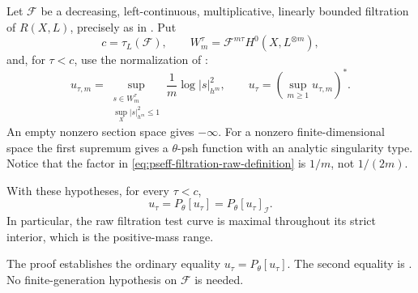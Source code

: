 Let \(\mathcal F\) be a decreasing, left-continuous, multiplicative,
linearly bounded filtration of \(R(X,L)\), precisely as in
\cite[Definition~4.1]{DXZ23}.  Put
\[
 c=\tau_L(\mathcal F),\qquad
 W_m^\tau=\mathcal F^{m\tau}H^0(X,L^{\otimes m}),
\]
and, for \(\tau<c\), use the normalization of
\cite[Definition~4.3]{DXZ23}:
\[
\tag{71.48a}\label{eq:pseff-filtration-raw-definition}
 u_{\tau,m}
 =\sup_{\substack{s\in W_m^\tau\\
             \sup_X|s|_{h^m}^2\leq1}}
       \frac1m\log|s|_{h^m}^2,\qquad
 u_\tau=\left(\sup_{m\geq1}u_{\tau,m}\right)^*.
\]
An empty nonzero section space gives \(-\infty\).
For a nonzero finite-dimensional space the first supremum gives a
\(\theta\)-psh function with an analytic singularity type.  Notice that the
factor in \eqref{eq:pseff-filtration-raw-definition} is \(1/m\), not
\(1/(2m)\).

\begin{theorem}\label{thm:pseff-filtration-maximality}
With these hypotheses, for every \(\tau<c\),
\[
\tag{71.48b}\label{eq:pseff-filtration-maximality}
 u_\tau=P_\theta[u_\tau]=P_\theta[u_\tau]_{\mathcal I}.
\]
In particular, the raw filtration test curve is maximal throughout its
strict interior, which is the positive-mass range.
\end{theorem}

The proof establishes the ordinary equality
\(u_\tau=P_\theta[u_\tau]\).  The second equality is
\cite[Lemma~4.5]{DXZ23}.  No finite-generation hypothesis on
\(\mathcal F\) is needed.

